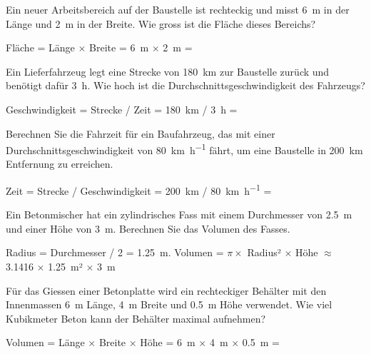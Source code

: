 \begin{questions}
  \question Ein neuer Arbeitsbereich auf der Baustelle ist rechteckig und misst \SI{6}{\metre} in der Länge und \SI{2}{\metre} in der Breite. Wie gross ist die Fläche dieses Bereichs?
  \begin{solution}
  Fläche = Länge $\times$ Breite = \SI{6}{\metre} $\times$ \SI{2}{\metre} = 
  \end{solution}

  \question Ein Lieferfahrzeug legt eine Strecke von \SI{180}{\kilo\metre} zur Baustelle zurück und benötigt dafür \SI{3}{\hour}. Wie hoch ist die Durchschnittsgeschwindigkeit des Fahrzeugs?
  \begin{solution}
  Geschwindigkeit = Strecke / Zeit = \SI{180}{\kilo\metre} / \SI{3}{\hour} = 
  \end{solution}

  \question Berechnen Sie die Fahrzeit für ein Baufahrzeug, das mit einer Durchschnittsgeschwindigkeit von \SI{80}{\kilo\metre\per\hour} fährt, um eine Baustelle in \SI{200}{\kilo\metre} Entfernung zu erreichen.
  \begin{solution}
  Zeit = Strecke / Geschwindigkeit = \SI{200}{\kilo\metre} / \SI{80}{\kilo\metre\per\hour} = 
  \end{solution}

  \question Ein Betonmischer hat ein zylindrisches Fass mit einem Durchmesser von \SI{2.5}{\metre} und einer Höhe von \SI{3}{\metre}. Berechnen Sie das Volumen des Fasses.
  \begin{solution}
  Radius = Durchmesser / 2 = \SI{1.25}{\metre}. Volumen = $\pi \times$ Radius² $\times$ Höhe $\approx$ 3.1416 $\times$ \SI{1.25}{\metre}² $\times$ \SI{3}{\metre} \approx {}
  \end{solution}

  \question Für das Giessen einer Betonplatte wird ein rechteckiger Behälter mit den Innenmassen \SI{6}{\metre} Länge, \SI{4}{\metre} Breite und \SI{0.5}{\metre} Höhe verwendet. Wie viel Kubikmeter Beton kann der Behälter maximal aufnehmen?
  \begin{solution}
  Volumen = Länge $\times$ Breite $\times$ Höhe = \SI{6}{\metre} $\times$ \SI{4}{\metre} $\times$ \SI{0.5}{\metre} = 
  \end{solution}
\end{questions}

